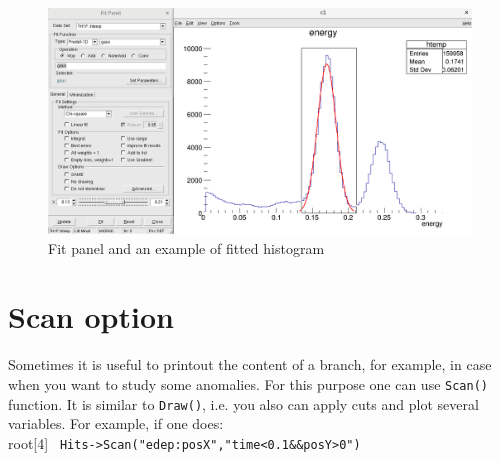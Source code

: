 \documentclass[12pt]{article}
\begin{document}
\begin{figure}[h]
\centering
\includegraphics[scale=0.35]{figs/FitPanel.png}
\caption{Fit panel and an example of fitted histogram}
\label{fig:FitPanel}
\end{figure}


\section{Scan option}
Sometimes it is useful to printout the content of a branch, for example, in case when you want to study some anomalies. For this purpose one can use \verb|Scan()| function. It is similar to \verb|Draw()|, i.e. you also can apply cuts and plot several variables. For example, if one does: \\
root[4] \verb| Hits->Scan("edep:posX","time<0.1&&posY>0") |\\
\end{document}
